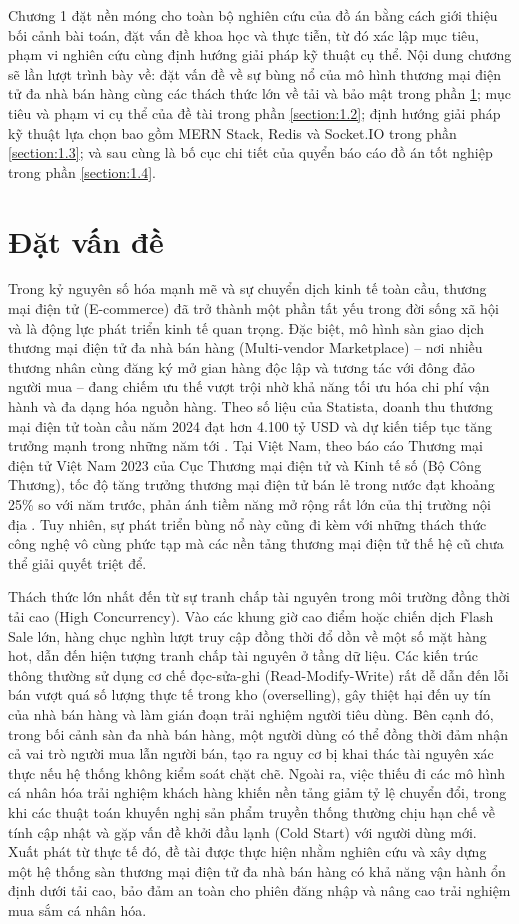\documentclass[../DoAn.tex]{subfiles}
\begin{document}
Chương 1 đặt nền móng cho toàn bộ nghiên cứu của đồ án bằng cách giới thiệu bối cảnh bài toán, đặt vấn đề khoa học và thực tiễn, từ đó xác lập mục tiêu, phạm vi nghiên cứu cùng định hướng giải pháp kỹ thuật cụ thể. Nội dung chương sẽ lần lượt trình bày về: đặt vấn đề về sự bùng nổ của mô hình thương mại điện tử đa nhà bán hàng cùng các thách thức lớn về tải và bảo mật trong phần \ref{section:1.1}; mục tiêu và phạm vi cụ thể của đề tài trong phần \ref{section:1.2}; định hướng giải pháp kỹ thuật lựa chọn bao gồm MERN Stack, Redis và Socket.IO trong phần \ref{section:1.3}; và sau cùng là bố cục chi tiết của quyển báo cáo đồ án tốt nghiệp trong phần \ref{section:1.4}.

\section{Đặt vấn đề}
\label{section:1.1}
Trong kỷ nguyên số hóa mạnh mẽ và sự chuyển dịch kinh tế toàn cầu, thương mại điện tử (E-commerce) đã trở thành một phần tất yếu trong đời sống xã hội và là động lực phát triển kinh tế quan trọng. Đặc biệt, mô hình sàn giao dịch thương mại điện tử đa nhà bán hàng (Multi-vendor Marketplace) -- nơi nhiều thương nhân cùng đăng ký mở gian hàng độc lập và tương tác với đông đảo người mua -- đang chiếm ưu thế vượt trội nhờ khả năng tối ưu hóa chi phí vận hành và đa dạng hóa nguồn hàng. Theo số liệu của Statista, doanh thu thương mại điện tử toàn cầu năm 2024 đạt hơn 4.100 tỷ USD và dự kiến tiếp tục tăng trưởng mạnh trong những năm tới \cite{statista-ecommerce}. Tại Việt Nam, theo báo cáo Thương mại điện tử Việt Nam 2023 của Cục Thương mại điện tử và Kinh tế số (Bộ Công Thương), tốc độ tăng trưởng thương mại điện tử bán lẻ trong nước đạt khoảng 25\% so với năm trước, phản ánh tiềm năng mở rộng rất lớn của thị trường nội địa \cite{moit-whitepaper2023}. Tuy nhiên, sự phát triển bùng nổ này cũng đi kèm với những thách thức công nghệ vô cùng phức tạp mà các nền tảng thương mại điện tử thế hệ cũ chưa thể giải quyết triệt để.

Thách thức lớn nhất đến từ sự tranh chấp tài nguyên trong môi trường đồng thời tải cao (High Concurrency). Vào các khung giờ cao điểm hoặc chiến dịch Flash Sale lớn, hàng chục nghìn lượt truy cập đồng thời đổ dồn về một số mặt hàng hot, dẫn đến hiện tượng tranh chấp tài nguyên ở tầng dữ liệu. Các kiến trúc thông thường sử dụng cơ chế đọc-sửa-ghi (Read-Modify-Write) rất dễ dẫn đến lỗi bán vượt quá số lượng thực tế trong kho (overselling), gây thiệt hại đến uy tín của nhà bán hàng và làm gián đoạn trải nghiệm người tiêu dùng. Bên cạnh đó, trong bối cảnh sàn đa nhà bán hàng, một người dùng có thể đồng thời đảm nhận cả vai trò người mua lẫn người bán, tạo ra nguy cơ bị khai thác tài nguyên xác thực nếu hệ thống không kiểm soát chặt chẽ. Ngoài ra, việc thiếu đi các mô hình cá nhân hóa trải nghiệm khách hàng khiến nền tảng giảm tỷ lệ chuyển đổi, trong khi các thuật toán khuyến nghị sản phẩm truyền thống thường chịu hạn chế về tính cập nhật và gặp vấn đề khởi đầu lạnh (Cold Start) với người dùng mới. Xuất phát từ thực tế đó, đề tài được thực hiện nhằm nghiên cứu và xây dựng một hệ thống sàn thương mại điện tử đa nhà bán hàng có khả năng vận hành ổn định dưới tải cao, bảo đảm an toàn cho phiên đăng nhập và nâng cao trải nghiệm mua sắm cá nhân hóa.
\end{document}
